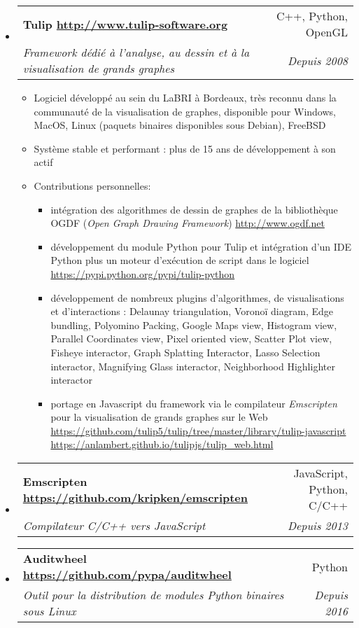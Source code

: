 \documentclass[letterpaper,11pt]{article}
\makeatletter
\newcommand{\ressubheading}[4]{
\begin{tabular*}{6.5in}{l@{\cftdotfill{\cftsecdotsep}\extracolsep{\fill}}r}
    \textbf{#1} & #2 \\
    \textit{#3} & \textit{#4} \\
\end{tabular*}\vspace{-6pt}}
\makeatother
\begin{document}
\begin{itemize}

\item \ressubheading{Tulip \url{http://www.tulip-software.org}}{C++, Python, OpenGL}{Framework dédié à l'analyse, au dessin et à la visualisation de grands graphes}{Depuis 2008}

\begin{itemize}
  \item Logiciel développé au sein du LaBRI à Bordeaux, très reconnu dans la communauté de la visualisation de graphes, disponible pour Windows, MacOS, Linux (paquets binaires disponibles sous Debian), FreeBSD
  \item Système stable et performant : plus de 15 ans de développement à son actif
  \item Contributions personnelles:
  \begin{itemize}
    \item intégration des algorithmes de dessin de graphes de la bibliothèque OGDF (\emph{Open Graph Drawing Framework}) \url{http://www.ogdf.net}
    \item développement du module Python pour Tulip et intégration d'un IDE Python plus un moteur d'exécution de script dans le logiciel \url{https://pypi.python.org/pypi/tulip-python}
    \item développement de nombreux plugins d'algorithmes, de visualisations et d'interactions : Delaunay triangulation, Voronoï diagram, Edge bundling, Polyomino Packing, Google Maps view, Histogram view, Parallel Coordinates view, Pixel oriented view, Scatter Plot view, Fisheye interactor, Graph Splatting Interactor, Lasso Selection interactor, Magnifying Glass interactor, Neighborhood Highlighter interactor
    \item portage en Javascript du framework via le compilateur \emph{Emscripten} pour la visualisation de grands graphes sur le Web \url{https://github.com/tulip5/tulip/tree/master/library/tulip-javascript} \url{https://anlambert.github.io/tulipjs/tulip_web.html}
  \end{itemize}
\end{itemize}

\item \ressubheading{Emscripten \url{https://github.com/kripken/emscripten}}{JavaScript, Python, C/C++}{Compilateur C/C++ vers JavaScript}{Depuis 2013}

\item \ressubheading{Auditwheel \url{https://github.com/pypa/auditwheel}}{Python}{Outil pour la distribution de modules Python binaires sous Linux}{Depuis 2016}

\end{itemize}
\end{document}
